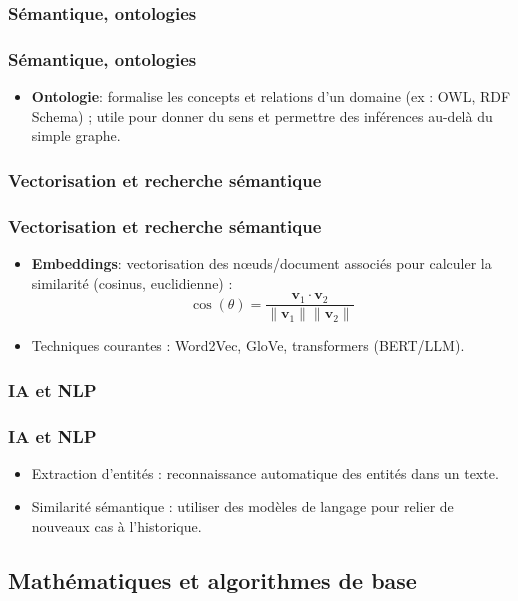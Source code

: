 \documentclass{beamer}
\begin{document}
\subsubsection{Sémantique, ontologies}
\begin{frame}
  \frametitle{Sémantique, ontologies}

  \begin{itemize}
    \item \textbf{Ontologie}: formalise les concepts et relations d’un domaine (ex : OWL, RDF Schema) ; utile pour donner du sens et permettre des inférences au-delà du simple graphe.
  \end{itemize}
\end{frame}

\subsubsection{Vectorisation et recherche sémantique}
\begin{frame}
  \frametitle{Vectorisation et recherche sémantique}

  \begin{itemize}
    \item \textbf{Embeddings}: vectorisation des nœuds/document associés pour calculer la similarité (cosinus, euclidienne) :
    \[
    \cos(\theta) = \frac{\mathbf{v}_1 \cdot \mathbf{v}_2}{\|\mathbf{v}_1\|\|\mathbf{v}_2\|}
    \]
    \item Techniques courantes : Word2Vec, GloVe, transformers (BERT/LLM).
  \end{itemize}
\end{frame}

\subsubsection{IA et NLP}
\begin{frame}
  \frametitle{IA et NLP}

  \begin{itemize}
    \item Extraction d’entités : reconnaissance automatique des entités dans un texte.
    \item Similarité sémantique : utiliser des modèles de langage pour relier de nouveaux cas à l’historique.
  \end{itemize}
\end{frame}

\subsection{Mathématiques et algorithmes de base}
\end{document}
